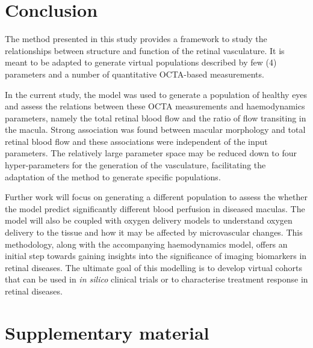 \documentclass[11pt,]{article}
\newcommand{\supplementarysection}{%
  \setcounter{figure}{0}%
  \setcounter{table}{0}
  \let\oldthefigure\thefigure%
  \let\oldthetable\thetable
  \renewcommand{\thefigure}{S\oldthefigure}%
  \renewcommand{\thetable}{S\oldthetable}
  \section{Supplementary material}%
  \let\oldsection\section%
  \renewcommand{\section}{%
    \let\thefigure\oldthefigure%
    \let\section\oldsection%
    \oldsection%
  }
}
\begin{document}
\section{Conclusion}\label{sec:conclusion}

The method presented in this study provides a framework to study the relationships between structure and function of the retinal vasculature.
It is meant to be adapted to generate virtual populations described by few (4) parameters and a number of quantitative OCTA-based measurements.

In the current study, the model was used to generate a population of healthy eyes and assess the relations between these OCTA measurements and haemodynamics parameters, namely the total retinal blood flow and the ratio of flow transiting in the macula.
Strong association was found between macular morphology and total retinal blood flow and these associations were independent of the input parameters.
The relatively large parameter space may be reduced down to four hyper-parameters for the generation of the vasculature, facilitating the adaptation of the method to generate specific populations.

Further work will focus on generating a different population to assess the whether the model predict significantly different blood perfusion in diseased maculas.
The model will also be coupled with oxygen delivery models to understand oxygen delivery to the tissue and how it may be affected by microvascular changes.
This methodology, along with the accompanying haemodynamics model, offers an initial step towards gaining insights into the significance of imaging biomarkers in retinal diseases.
The ultimate goal of this modelling is to develop virtual cohorts that can be used in \textit{in silico} clinical trials or to characterise treatment response in retinal diseases.



\supplementarysection
\end{document}
